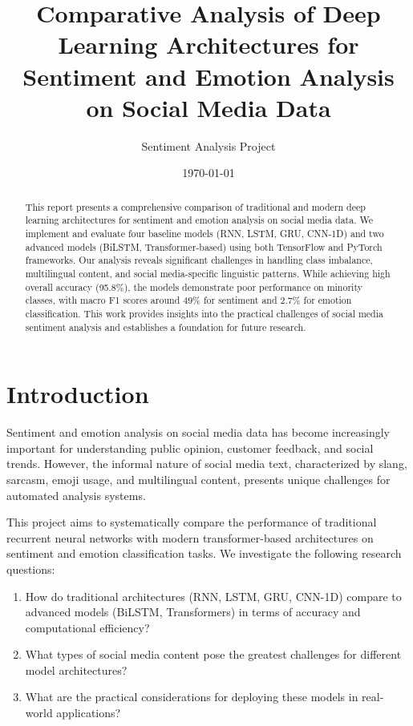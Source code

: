 \documentclass[11pt,a4paper]{article}
\title{Comparative Analysis of Deep Learning Architectures for Sentiment and Emotion Analysis on Social Media Data}
\author{Sentiment Analysis Project}
\date{\today}
\begin{document}
\maketitle

\begin{abstract}
This report presents a comprehensive comparison of traditional and modern deep learning architectures for sentiment and emotion analysis on social media data. We implement and evaluate four baseline models (RNN, LSTM, GRU, CNN-1D) and two advanced models (BiLSTM, Transformer-based) using both TensorFlow and PyTorch frameworks. Our analysis reveals significant challenges in handling class imbalance, multilingual content, and social media-specific linguistic patterns. While achieving high overall accuracy (95.8\%), the models demonstrate poor performance on minority classes, with macro F1 scores around 49\% for sentiment and 2.7\% for emotion classification. This work provides insights into the practical challenges of social media sentiment analysis and establishes a foundation for future research.
\end{abstract}

\section{Introduction}

Sentiment and emotion analysis on social media data has become increasingly important for understanding public opinion, customer feedback, and social trends. However, the informal nature of social media text, characterized by slang, sarcasm, emoji usage, and multilingual content, presents unique challenges for automated analysis systems.

This project aims to systematically compare the performance of traditional recurrent neural networks with modern transformer-based architectures on sentiment and emotion classification tasks. We investigate the following research questions:

\begin{enumerate}
    \item How do traditional architectures (RNN, LSTM, GRU, CNN-1D) compare to advanced models (BiLSTM, Transformers) in terms of accuracy and computational efficiency?
    \item What types of social media content pose the greatest challenges for different model architectures?
    \item What are the practical considerations for deploying these models in real-world applications?
\end{enumerate}
\end{document}
